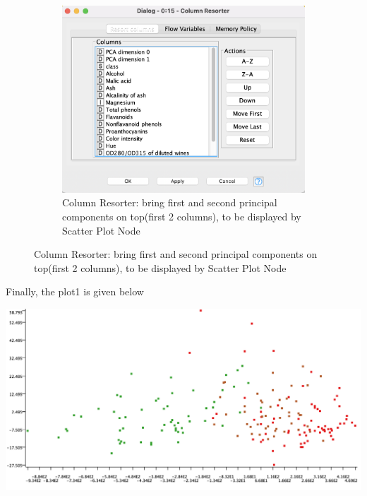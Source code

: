 \documentclass[11pt]{article}
\begin{document}
\begin{figure}[H]
\begin{subfigure}{0.4\textwidth}
					\label{fig:second}
				\end{subfigure}
				\hfill
				\begin{subfigure}{0.4\textwidth}
					\includegraphics[width=\textwidth]{res/t1/t11/t11-column-resorter-conf}
					\caption{Column Resorter: bring first and second principal components on top(first 2 columns), to be displayed by Scatter Plot Node}
					\label{fig:third}
				\end{subfigure}	
				\label{fig:figures}
			\end{figure}
			\fi
			Finally, the plot1 is given below
			\iftrue
			\begin{center}
				\includegraphics[scale=0.5]{res/t1/t11/t11-plot1}
			\end{center}
			\fi
\end{document}

